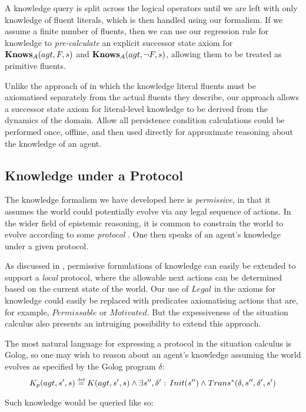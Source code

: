 A knowledge query is split across the logical operators until we are
left with only knowledge of fluent literals, which is then handled
using our formalism. If we assume a finite number of fluents, then
we can use our regression rule for knowledge to \emph{pre-calculate}
an explicit successor state axiom for $\mathbf{Knows}_{A}(agt,F,s)$ and $\mathbf{Knows}_{A}(agt,\neg F,s)$,
allowing them to be treated as primitive fluents.

Unlike the approach of \citep{demolombe00tractable_sc_belief} in
which the knowledge literal fluents must be axiomatised separately
from the actual fluents they describe, our approach allows a successor
state axiom for literal-level knowledge to be derived from the dynamics
of the domain. Allow all persistence condition calculations could
be performed once, offline, and then used directly for approximate
reasoning about the knowledge of an agent.


\subsection{Knowledge under a Protocol}

The knowledge formalism we have developed here is \emph{permissive},
in that it assumes the world could potentially evolve via any legal
sequence of actions. In the wider field of epistemic reasoning, it
is common to constrain the world to evolve according to some \emph{protocol}
\citep{halpern90knowledge_distrib,fagin95,vanBentham06tree_of_knowledge}.
One then speaks of an agent's knowledge under a given protocol.

As discussed in \citep{vanBentham06tree_of_knowledge}, permissive
formulations of knowledge can easily be extended to support a \emph{local}
protocol, where the allowable next actions can be determined based
on the current state of the world. Our use of $Legal$ in the axioms
for knowledge could easily be replaced with predicates axiomatising
actions that are, for example, $Permissable$ or $Motivated$. But
the expessiveness of the situation calculus also presents an intruiging
possibility to extend this approach.

The most natural language for expressing a protocol in the situation
calculus is Golog, so one may wish to reason about an agent's knowledge
assuming the world evolves as specified by the Golog program $\delta$:\[
K_{p}(agt,s',s)\stackrel{\mbox{\tiny def}}{=} K(agt,s',s)\wedge\exists s'',\delta':\, Init(s'')\wedge Trans^{*}(\delta,s'',\delta',s')\]


Such knowledge would be queried like so:


